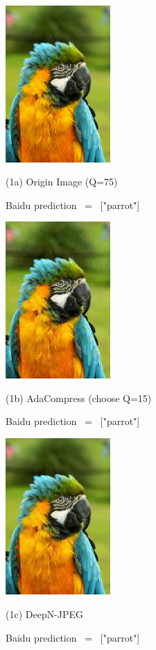 \begin{figure}[htbp]
    \begin{minipage}{0.3\linewidth}
        \centerline{\includegraphics[width=4.0cm,trim=0 80 0 100,clip ]{figures/parrot_q75.jpeg}}
        \centerline{(1a) Origin Image (Q=75)}
        \centerline{Baidu prediction \ = \ ["parrot"]}
    \end{minipage}
    \hfill
    \begin{minipage}{0.2\linewidth}
        \centerline{\includegraphics[width=4.0cm,trim=0 80 0 100,clip ]{figures/parrot_q15.jpeg}}
        \centerline{(1b) AdaCompress (choose Q=15)}
        \centerline{Baidu prediction \ = \ ["parrot"]}
    \end{minipage}
    \hfill
    \begin{minipage}{0.3\linewidth}
        \centerline{\includegraphics[width=4.0cm,trim=0 80 0 100,clip ]{figures/parrot_deepn.jpeg}}
        \centerline{(1c) DeepN-JPEG}
        \centerline{Baidu prediction \ = \ ["parrot"]}
    \end{minipage}
    

\end{figure}
